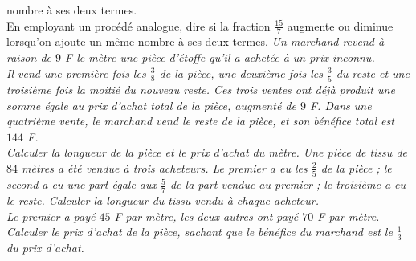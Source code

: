 \begin{itemize}
 nombre à ses deux termes. \\En employant un procédé analogue, dire si la fraction $\frac{15}7$ augmente ou 
 diminue lorsqu'on ajoute un même nombre à ses deux termes.
 \it Un marchand revend à raison de $9$ F le mètre une pièce d'étoffe qu'il a achetée à un prix inconnu. \\
 Il vend une première fois les $\frac38$ de la pièce, une deuxième fois les $\frac35$ du reste et une troisième fois la moitié du nouveau reste. Ces trois ventes ont déjà produit une somme égale au prix d'achat total de la pièce, augmenté de $9$ F. Dans une quatrième vente, le marchand vend le reste de la pièce, et son bénéfice total est $144$ F. \\Calculer la longueur de la pièce et le prix d'achat du mètre. 
 \it Une pièce de tissu de $84$ mètres a été vendue à trois acheteurs. Le premier a eu les $\frac25$ de la pièce ; le second a eu une part égale aux $\frac57$ de la
 part vendue au premier ; le troisième a eu le reste.
 Calculer la longueur du tissu vendu à chaque acheteur.\\
 Le premier a payé $45$ F par mètre, les deux autres ont payé $70$ F par mètre. 
Calculer le prix d'achat de la pièce, sachant que le bénéfice du marchand est le $\frac13$ du prix d'achat.
 \end{itemize}